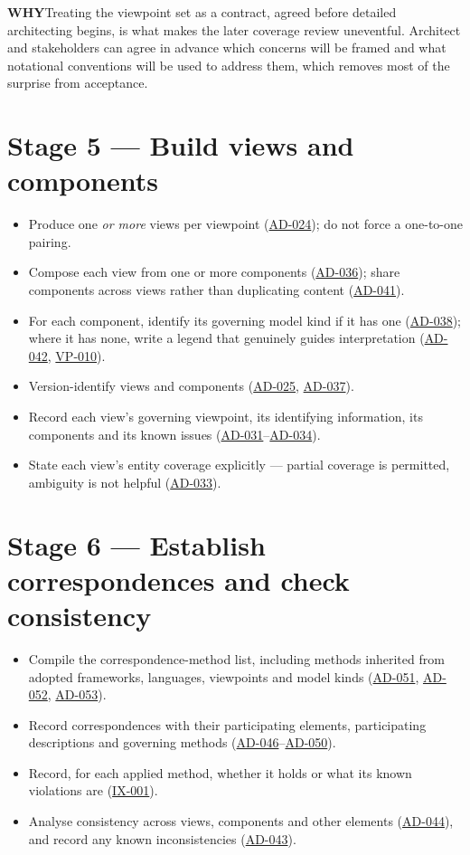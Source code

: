\documentclass[11pt,a4paper]{report}
\newcommand{\calloutlead}[2]{{\sffamily\bfseries\footnotesize\color{#1}#2\quad}}
\newcommand{\why}[1]{\begin{whybox}\calloutlead{navy}{WHY}#1\end{whybox}}
\newcommand{\rref}[1]{\hyperref[rule:#1]{\textsf{\small #1}}}
\begin{document}
\why{Treating the viewpoint set as a contract, agreed before detailed
architecting begins, is what makes the later coverage review uneventful.
Architect and stakeholders can agree in advance which concerns will be framed
and what notational conventions will be used to address them, which removes most
of the surprise from acceptance.}

\section{Stage 5 --- Build views and components}

\begin{itemize}
  \item Produce one \emph{or more} views per viewpoint
        (\rref{AD-024}); do not force a one-to-one pairing.
  \item Compose each view from one or more components
        (\rref{AD-036}); share components across views rather
        than duplicating content (\rref{AD-041}).
  \item For each component, identify its governing model kind if it has one
        (\rref{AD-038}); where it has none, write a legend that
        genuinely guides interpretation
        (\rref{AD-042}, \rref{VP-010}).
  \item Version-identify views and components
        (\rref{AD-025}, \rref{AD-037}).
  \item Record each view's governing viewpoint, its identifying information, its
        components and its known issues
        (\rref{AD-031}--\rref{AD-034}).
  \item State each view's entity coverage explicitly --- partial coverage is
        permitted, ambiguity is not helpful
        (\rref{AD-033}).
\end{itemize}

\section{Stage 6 --- Establish correspondences and check consistency}

\begin{itemize}
  \item Compile the correspondence-method list, including methods inherited from
        adopted frameworks, languages, viewpoints and model kinds
        (\rref{AD-051}, \rref{AD-052},
        \rref{AD-053}).
  \item Record correspondences with their participating elements, participating
        descriptions and governing methods
        (\rref{AD-046}--\rref{AD-050}).
  \item Record, for each applied method, whether it holds or what its known
        violations are (\rref{IX-001}).
  \item Analyse consistency across views, components and other elements
        (\rref{AD-044}), and record any known inconsistencies
        (\rref{AD-043}).
\end{itemize}
\end{document}
